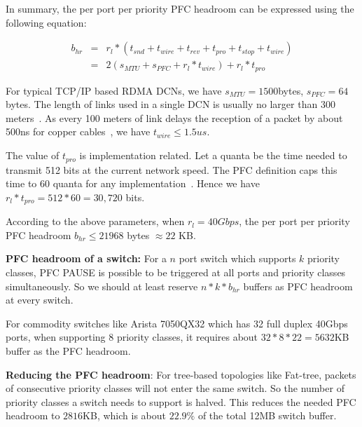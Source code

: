 In summary, the per port per priority PFC headroom can be expressed using the following equation:


\begin{eqnarray} \label{eqn:pfcheadroom}
b_{hr} &=& r_{l}*(t_{snd}+t_{wire}+t_{rev}+t_{pro}+t_{stop}+t_{wire})     \nonumber \\
&=& 2(s_{MTU}+s_{PFC}+r_l*t_{wire})+r_l*t_{pro}
\end{eqnarray}

For typical TCP/IP based RDMA DCNs, we have $s_{MTU}=1500$bytes, $s_{PFC}=64$bytes. The length of links used in a single DCN is usually no larger than 300 meters~\cite{rdmaatscale}. As every 100 meters of link delays the reception of a packet by about 500ns for copper cables~\cite{pfcheadroom}, we have $t_{wire} \leq 1.5us$.

The value of  $t_{pro}$ is implementation related. Let a quanta be the time needed to transmit 512 bits at the current network speed. The PFC definition caps this time to 60 quanta for any implementation~\cite{pfcheadroom}. Hence we have $r_l*t_{pro}=512 * 60 = 30,720 $ bits.

According to the above parameters, when  $r_l=40Gbps$, the per port per priority PFC headroom $b_{hr} \leq 21968$ bytes $\approx 22$ KB.

\textbf{PFC headroom of a switch:} For a $n$ port switch which supports $k$ priority classes, PFC PAUSE is possible to be triggered at all ports and priority classes simultaneously. So we should at least reserve $n*k*b_{hr}$ buffers as PFC headroom at every switch.

For commodity switches like Arista 7050QX32 which has 32 full duplex 40Gbps ports, when supporting 8 priority classes, it requires about $32*8*22=5632$KB buffer as the PFC headroom.

\textbf{Reducing the PFC headroom}: For tree-based topologies like Fat-tree, packets of consecutive priority classes will not enter the same switch. So the number of priority classes a switch needs to support is halved.  This reduces the needed PFC headroom to $2816$KB, which is about $22.9\%$ of the total 12MB switch buffer.



